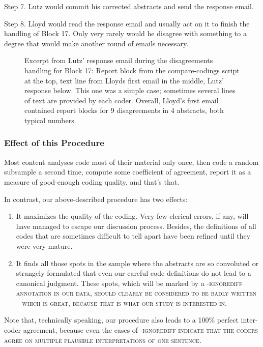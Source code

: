 \documentclass[10pt,journal,compsoc]{IEEEtran}
\newcommand{\Cb}[1]{\bgroup\scshape #1\egroup}  %
\newcommand{\Prg}[1]{\bgroup\ttfamily #1\egroup}  %
\begin{document}
Step 7. Lutz would commit his corrected abstracts and send the response email.

Step 8. Lloyd would read the response email and usually act on it to finish the handling of
Block 17.
Only very rarely would he disagree with something to a degree that would make
another round of emails necessary.

\begin{figure}[tbp]%
	\centering{}%
	\vspace{-2mm}\caption{Excerpt from Lutz' response email during the disagreements handling
		for Block 17:
		Report block from the \Prg{compare-codings} script at the top,
		text line from Lloyds first email in the middle,
		Lutz' response below.
		This one was a simple case;
		sometimes several lines of text are provided by each coder.
		Overall, Lloyd's first email contained report blocks for 9 disagreements
		in 4 abstracts, both typical numbers.}\label{email-MeyAlmKel22.png}%
\end{figure}


\subsubsection{Effect of this Procedure}

Most content analyses code most of their material only once,
then code a random subsample a second time,
compute some coefficient of agreement,
report it as a measure of good-enough coding quality,
and that's that.

In contrast, our above-described procedure has two effects:
\begin{enumerate}
	\item It maximizes the quality of the coding.
	  Very few clerical errors, if any, will have managed to escape our discussion process.
	  Besides, the definitions of all codes that are sometimes difficult to tell apart
	  have been refined until they were very mature.
	\item It finds all those spots in the sample where the abstracts are so convoluted
	  or strangely formulated that even our careful code definitions do not lead
	  to a canonical judgment.
	  These spots, which will be marked by a \Cb{-ignorediff} annotation in our data,
	  should clearly be considered to be badly written -- which is great,
	  because that is what our study is interested in.
\end{enumerate}
Note that, technically speaking, our procedure also leads to a 100\% perfect inter-coder agreement,
because even the cases of \Cb{-ignorediff} indicate that
the coders agree on multiple plausible interpretations of one sentence.
\end{document}
